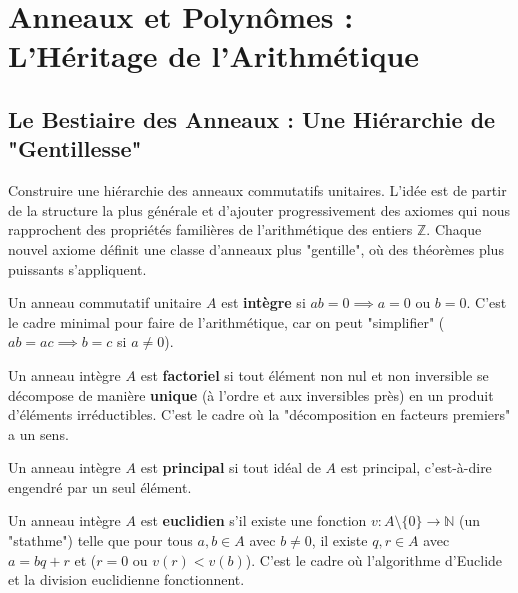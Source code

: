 \chapter{Anneaux et Polynômes : L'Héritage de l'Arithmétique}

\section{Le Bestiaire des Anneaux : Une Hiérarchie de "Gentillesse"}

\begin{objectif}
    Construire une hiérarchie des anneaux commutatifs unitaires. L'idée est de partir de la structure la plus générale et d'ajouter progressivement des axiomes qui nous rapprochent des propriétés familières de l'arithmétique des entiers $\mathbb{Z}$. Chaque nouvel axiome définit une classe d'anneaux plus "gentille", où des théorèmes plus puissants s'appliquent.
\end{objectif}

\begin{definition}
    Un anneau commutatif unitaire $A$ est \textbf{intègre} si $ab=0 \implies a=0$ ou $b=0$. C'est le cadre minimal pour faire de l'arithmétique, car on peut "simplifier" ($ab=ac \implies b=c$ si $a \neq 0$).
\end{definition}

\begin{definition}
    Un anneau intègre $A$ est \textbf{factoriel} si tout élément non nul et non inversible se décompose de manière \textbf{unique} (à l'ordre et aux inversibles près) en un produit d'éléments irréductibles. C'est le cadre où la "décomposition en facteurs premiers" a un sens.
\end{definition}

\begin{definition}
    Un anneau intègre $A$ est \textbf{principal} si tout idéal de $A$ est principal, c'est-à-dire engendré par un seul élément.
\end{definition}

\begin{definition}
    Un anneau intègre $A$ est \textbf{euclidien} s'il existe une fonction $v: A \setminus \{0\} \to \mathbb{N}$ (un "stathme") telle que pour tous $a, b \in A$ avec $b \neq 0$, il existe $q, r \in A$ avec $a = bq + r$ et ($r=0$ ou $v(r) < v(b)$). C'est le cadre où l'algorithme d'Euclide et la division euclidienne fonctionnent.
\end{definition}

